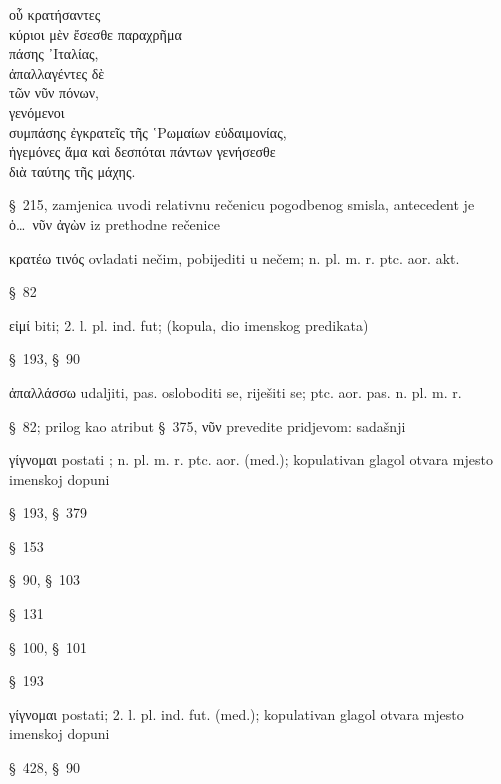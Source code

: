 
{\large
\begin{greek}
\noindent οὗ κρατήσαντες \\
κύριοι μὲν ἔσεσθε παραχρῆμα \\
\tabto{2em} πάσης ᾿Ιταλίας, \\
ἀπαλλαγέντες δὲ \\
\tabto{2em} τῶν νῦν πόνων, \\
γενόμενοι \\
\tabto{2em} συμπάσης ἐγκρατεῖς τῆς ῾Ρωμαίων εὐδαιμονίας, \\
ἡγεμόνες ἅμα καὶ δεσπόται πάντων γενήσεσθε \\
\tabto{2em} διὰ ταύτης τῆς μάχης.\\

\end{greek}
}

\begin{description}[noitemsep]
\item[οὗ ] §~215, zamjenica uvodi relativnu rečenicu pogodbenog smisla, antecedent je ὁ\dots\ νῦν ἀγὼν iz prethodne rečenice
\item[κρατήσαντες ] κρατέω τινός ovladati nečim, pobijediti u nečem; n. pl. m. r. ptc. aor. akt.
\item[κύριοι ] §~82
\item[ἔσεσθε ] εἰμί biti; 2. l. pl. ind. fut; (kopula, dio imenskog predikata) 
\item[πάσης ᾿Ιταλίας ] §~193, §~90
\item[ἀπαλλαγέντες ] ἀπαλλάσσω udaljiti, pas. osloboditi se, riješiti se; ptc. aor. pas. n. pl. m. r. 
\item[τῶν νῦν πόνων] §~82; prilog kao atribut §~375, νῦν prevedite pridjevom: sadašnji
\item[γενόμενοι ] γίγνομαι postati ; n. pl. m. r. ptc. aor. (med.); kopulativan glagol otvara mjesto imenskoj dopuni
\item[συμπάσης] §~193, §~379 
\item[ἐγκρατεῖς ] §~153
\item[τῆς ῾Ρωμαίων εὐδαιμονίας] §~90, §~103
\item[ἡγεμόνες ] §~131
\item[δεσπόται ] §~100, §~101
\item[πάντων ] §~193
\item[γενήσεσθε ] γίγνομαι postati; 2. l. pl. ind. fut. (med.);  kopulativan glagol otvara mjesto imenskoj dopuni
\item[διὰ ταύτης τῆς μάχης ] §~428, §~90

\end{description}

